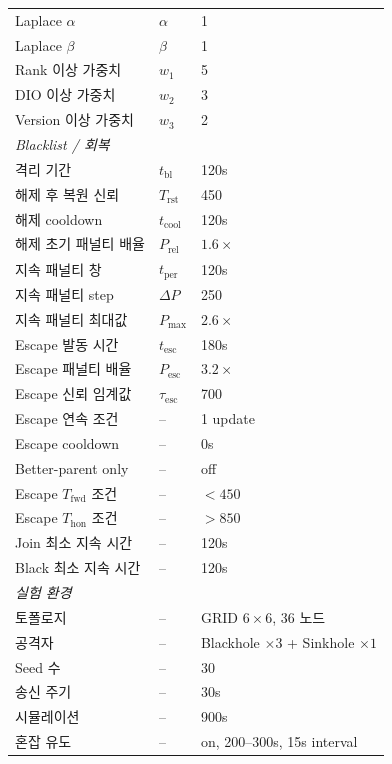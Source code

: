 \documentclass[12pt,a4paper]{article}
\begin{document}
\begin{table}[t]
\begin{tabular}{lll}
    Laplace $\alpha$        & $\alpha$   & 1 \\
    Laplace $\beta$         & $\beta$    & 1 \\
    Rank 이상 가중치        & $w_1$      & 5 \\
    DIO 이상 가중치         & $w_2$      & 3 \\
    Version 이상 가중치     & $w_3$      & 2 \\
    \midrule
    \multicolumn{3}{l}{\textit{Blacklist / 회복}} \\
    격리 기간               & $t_\text{bl}$     & 120s \\
    해제 후 복원 신뢰       & $T_\text{rst}$    & 450 \\
    해제 cooldown           & $t_\text{cool}$   & 120s \\
    해제 초기 패널티 배율   & $P_\text{rel}$    & $1.6\times$ \\
    지속 패널티 창          & $t_\text{per}$    & 120s \\
    지속 패널티 step        & $\Delta P$        & 250 \\
    지속 패널티 최대값      & $P_\text{max}$    & $2.6\times$ \\
    Escape 발동 시간        & $t_\text{esc}$    & 180s \\
    Escape 패널티 배율      & $P_\text{esc}$    & $3.2\times$ \\
    Escape 신뢰 임계값      & $\tau_\text{esc}$ & 700 \\
    Escape 연속 조건        & --                & 1 update \\
    Escape cooldown         & --                & 0s \\
    Better-parent only      & --                & off \\
    Escape $T_\text{fwd}$ 조건 & --             & $< 450$ \\
    Escape $T_\text{hon}$ 조건 & --             & $> 850$ \\
    Join 최소 지속 시간     & --                & 120s \\
    Black 최소 지속 시간    & --                & 120s \\
    \midrule
    \multicolumn{3}{l}{\textit{실험 환경}} \\
    토폴로지     & -- & GRID $6\times6$, 36 노드 \\
    공격자       & -- & Blackhole $\times3$ + Sinkhole $\times1$ \\
    Seed 수      & -- & 30 \\
    송신 주기    & -- & 30s \\
    시뮬레이션   & -- & 900s \\
    혼잡 유도    & -- & on, 200--300s, 15s interval \\
    \bottomrule
  \end{tabular}
\end{table}
\end{document}
